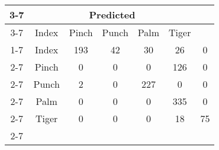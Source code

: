 \documentclass{standalone}
\begin{document}
 
 \begin{tabular}{|c |c |c |c |c |c |c |}
\cline{3-7}\multicolumn{2}{c|}{} & \multicolumn{5}{c|}{Predicted} \\ 
\cline{3-7} \multicolumn{2}{c |}{ } & Index & Pinch & Punch & Palm & Tiger\\ 
\cline{1-7}\multirow{5}{*}{\rotatebox[origin=c]{90}{Actual}} & Index & 193 & 42 & 30 & 26 & 0\\ 
 \cline{2-7} & Pinch & 0 & 0 & 0 & 126 & 0\\ 
 \cline{2-7} & Punch & 2 & 0 & 227 & 0 & 0\\ 
 \cline{2-7} & Palm & 0 & 0 & 0 & 335 & 0\\ 
 \cline{2-7} & Tiger & 0 & 0 & 0 & 18 & 75\\ 
 \cline{2-7}\hline \end{tabular}
 
\end{document}
